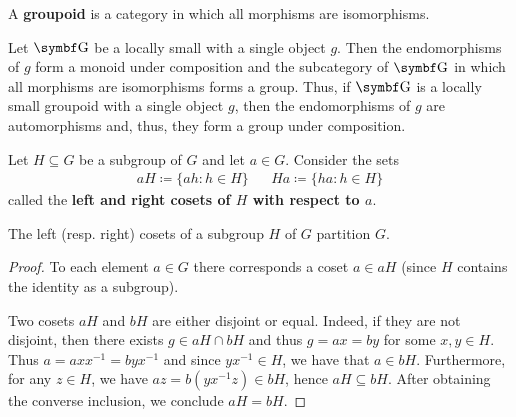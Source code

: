 \begin{definition}\label{def:groupoid}
  A \textbf{groupoid} is a category in which all morphisms are isomorphisms.
\end{definition}

\begin{definition}\label{note:groupoids}
  Let \( \Bold G \) be a locally small with a single object \( g \). Then the endomorphisms of \( g \) form a monoid under composition and the subcategory of \( \Bold G \) in which all morphisms are isomorphisms forms a group. Thus, if \( \Bold G \) is a locally small groupoid with a single object \( g \), then the endomorphisms of \( g \) are automorphisms and, thus, they form a group under composition.
\end{definition}

\begin{definition}\label{def:group_cosets}
  Let \( H \subseteq G \) be a subgroup of \( G \) and let \( a \in G \). Consider the sets
  \begin{align*}
    aH \coloneqq \{ ah \colon h \in H \}
    &&
    Ha \coloneqq \{ ha \colon h \in H \}
  \end{align*}
  called the \textbf{left and right cosets of \( H \) with respect to \( a \)}.
\end{definition}

\begin{proposition}\label{thm:coset_partition}
  The left (resp. right) cosets of a subgroup \( H \) of \( G \) partition \( G \).
\end{proposition}
\begin{proof}
  To each element \( a \in G \) there corresponds a coset \( a \in aH \) (since \( H \) contains the identity as a subgroup).

  Two cosets \( aH \) and \( bH \) are either disjoint or equal. Indeed, if they are not disjoint, then there exists \( g \in aH \cap bH \) and thus \( g = ax = by \) for some \( x, y \in H \). Thus \( a = a x x^{-1} = b y x^{-1} \) and since \( y x^{-1} \in H \), we have that \( a \in bH \). Furthermore, for any \( z \in H \), we have \( az = b(y x^{-1} z) \in bH \), hence \( aH \subseteq bH \). After obtaining the converse inclusion, we conclude \( aH = bH \).
\end{proof}

